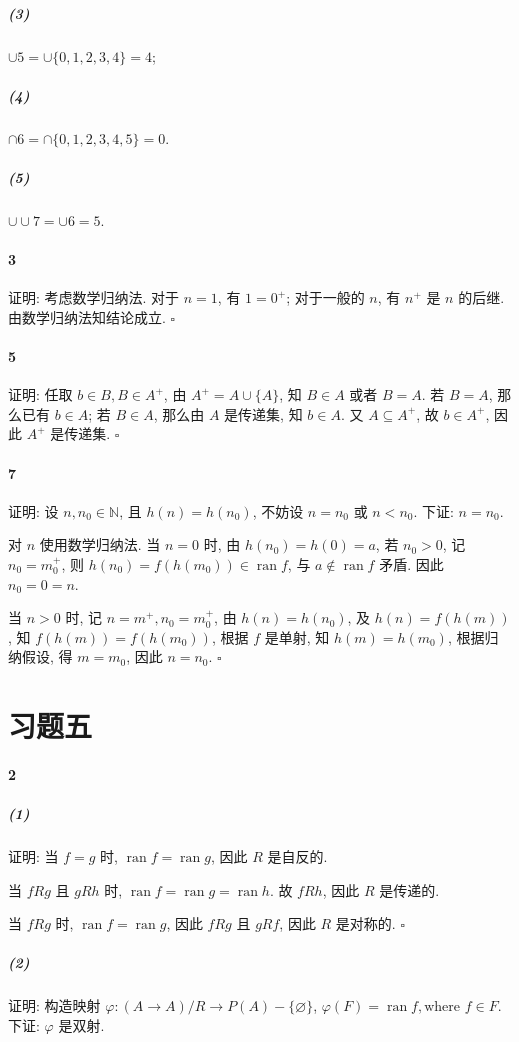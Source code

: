 \documentclass{ctexart}
\def\QED{\hfill $\square$}
\DeclareMathOperator{\ran}{ran}
\begin{document}
\subparagraph*{(3)} $\cup 5=\cup \{0,1,2,3,4\}=4$;

\subparagraph*{(4)} $\cap 6=\cap \{0,1,2,3,4,5\}=0$.

\subparagraph*{(5)} $\cup\cup 7=\cup 6=5$.

\paragraph*{3} 证明: 考虑数学归纳法. 对于 $n=1$, 有 $1=0^+$;
对于一般的 $n$, 有 $n^+$ 是 $n$ 的后继. 由数学归纳法知结论成立. \QED

\paragraph*{5} 证明: 任取 $b\in B, B\in A^+$, 由 $A^+=A\cup \{A\}$,
知 $B\in A$ 或者 $B=A$. 若 $B=A$, 那么已有 $b\in A$;
若 $B\in A$, 那么由 $A$ 是传递集, 知 $b\in A$.
又 $A\subseteq A^+$, 故 $b\in A^+$, 因此 $A^+$ 是传递集. \QED

\paragraph*{7} 证明: 设 $n, n_0 \in \mathbb{N}$, 且 $h(n)=h(n_0)$, 
不妨设 $n=n_0$ 或 $n< n_0$. 下证: $n=n_0$.

对 $n$ 使用数学归纳法.
当 $n=0$ 时, 由 $h(n_0)=h(0)=a$, 若 $n_0>0$, 记 $n_0=m_0^+$, 
则 $h(n_0)=f(h(m_0))\in \ran f$, 与 $a\notin \ran f$ 矛盾. 
因此 $n_0=0=n$.

当 $n>0$ 时, 记 $n=m^+, n_0=m_0^+$, 由 $h(n)=h(n_0)$, 
及 $h(n)=f(h(m))$, 知 $f(h(m))=f(h(m_0))$, 
根据 $f$ 是单射, 知 $h(m)=h(m_0)$, 根据归纳假设, 得 $m=m_0$,
因此 $n=n_0$. \QED

\section*{习题五}

\paragraph*{2} 

\subparagraph*{(1)} 证明: 当 $f=g$ 时, $\ran f=\ran g$,
因此 $R$ 是自反的.

当 $fRg$ 且 $gRh$ 时, $\ran f=\ran g=\ran h$. 故 $fRh$,
因此 $R$ 是传递的. 

当 $fRg$ 时, $\ran f=\ran g$, 因此 $fRg$ 且 $gRf$,
因此 $R$ 是对称的. \QED

\subparagraph*{(2)} 证明: 构造映射 $\varphi: (A\mathop{\to} A)/R \mathrel{\to} P(A)-\{\varnothing\}$,
$\varphi(F)=\ran f, \textrm{where } f\in F$.
下证: $\varphi$ 是双射.
\end{document}

